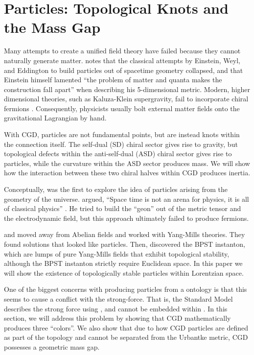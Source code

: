 
\section{Particles: Topological Knots and the Mass Gap}
\label{sec:Particles}

Many attempts to create a unified field theory have failed because they cannot naturally generate matter. \citet{goenner2004history} notes that the classical attempts by Einstein, Weyl, and Eddington to build particles out of spacetime geometry collapsed, and that Einstein himself lamented ``the problem of matter and quanta makes the construction fall apart'' when describing his 5-dimensional metric. Modern, higher dimensional theories, such as Kaluza-Klein supergravity, fail to incorporate chiral fermions \citep{witten1981search}. Consequently, physicists usually bolt external matter fields onto the gravitational Lagrangian by hand.

With CGD, particles are not fundamental points, but are instead knots within the connection itself. The self-dual (SD) chiral \slTwoC sector gives rise to gravity, but topological defects within the anti-self-dual (ASD) chiral \slTwoC sector gives rise to particles, while the curvature within the ASD sector produces mass. We will show how the interaction between these two chiral halves within CGD produces inertia.

Conceptually, \citet{wheeler1955geons} was the first to explore the idea of particles arising from the geometry of the universe. \citeauthor{wheeler1955geons} argued, ``Space time is not an arena for physics, it is all of classical physics'' \citep{wheeler1957nature}. He tried to build the ``geon'' out of the metric tensor and the electrodynamic field, but this approach ultimately failed to produce fermions.

\citet{thooft1974magnetic} and \citet{belavin1975pseudoparticle} moved away from Abelian fields and worked with Yang-Mills theories. They found solutions that looked like particles. Then, \citet{belavin1975pseudoparticle} discovered the BPST instanton, which are lumps of pure Yang-Mills fields that exhibit topological stability, although the BPST instanton strictly require Euclidean space. In this paper we will show the existence of topologically stable particles within Lorentzian space.

One of the biggest concerns with producing particles from a \spinFourC ontology is that this seems to cause a conflict with the strong-force. That is, the Standard Model describes the strong force using \suThree, and \suThree cannot be embedded within \spinFourC. In this section, we will address this problem by showing that CGD mathematically produces three ``colors''. We also show that due to how CGD particles are defined as part of the topology and cannot be separated from the Urbantke metric, CGD possesses a geometric mass gap.


